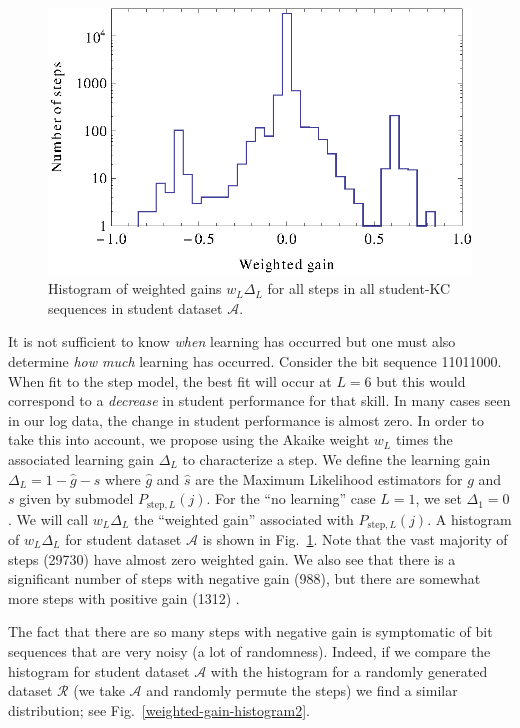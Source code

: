\documentclass{acmlarge-edm}
\begin{document}
\begin{figure}
  \centering \includegraphics{weighted-gain-histogram.eps}
   \caption{Histogram of weighted gains $w_L \Delta_L$ for
     all steps in all student-KC sequences in student dataset $\mathcal{A}$.}
    \label{weighted-gain-histogram}
\end{figure}

It is not sufficient to know {\it when} learning has occurred but one
must also determine {\it how much} learning has occurred.  Consider
the bit sequence 11011000.  When fit to the step model, the best fit
will occur at $L=6$ but this would correspond to a {\it decrease} in student
performance for that skill.  In many cases seen in our log data, 
the change in student performance is almost zero.  In order to take 
this into account,
we propose using the Akaike weight $w_L$ times the associated learning
gain $\Delta_L$ to characterize a step.  We define the learning gain
$\Delta_L=1-\hat{g}-\hat{s}$ where $\hat{g}$ and $\hat{s}$ are the
Maximum Likelihood estimators for $g$ and $s$ given by submodel
$P_{\mathrm{step},L}(j)$.  For the ``no learning'' case $L=1$, we set
$\Delta_1=0$.  We will call $w_L \Delta_L$ the ``weighted gain''
associated with $P_{\mathrm{step},L}(j)$.  A histogram of $w_L
\Delta_L$ for student dataset $\mathcal{A}$ is shown in
Fig.~\ref{weighted-gain-histogram}.  Note that the vast majority of
steps (29730) have almost zero weighted gain.  We also see that there
is a significant number of steps with negative gain (988), but there
are somewhat more steps with positive gain (1312) .

The fact that there are so many steps with negative gain is
symptomatic of bit sequences that are very noisy (a lot of
randomness).  Indeed, if we compare the histogram for student
dataset $\mathcal{A}$ with the histogram for a randomly 
generated dataset $\mathcal{R}$ (we take $\mathcal{A}$ and
randomly permute the steps) we find a similar distribution;
see Fig.~\ref{weighted-gain-histogram2}.
\end{document}
